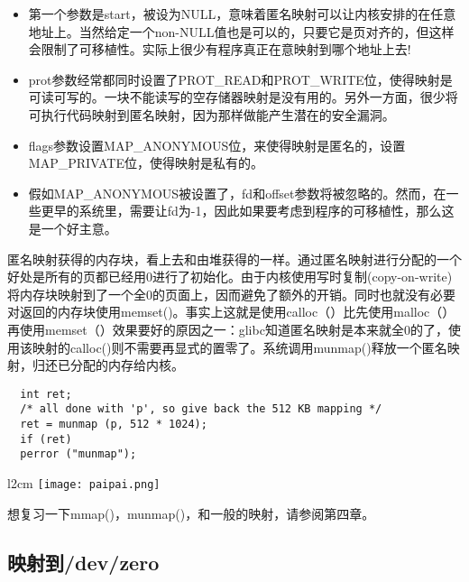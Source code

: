 \begin{itemize}
\item \begin{flushleft}第一个参数是start，被设为NULL，意味着匿名映射可以让内核安排的在任意地址上。当然给定一个non-NULL值也是可以的，只要它是页对齐的，但这样会限制了可移植性。实际上很少有程序真正在意映射到哪个地址上去!\end{flushleft}
\item \begin{flushleft}prot参数经常都同时设置了PROT\_READ和PROT\_WRITE位，使得映射是可读可写的。一块不能读写的空存储器映射是没有用的。另外一方面，很少将可执行代码映射到匿名映射，因为那样做能产生潜在的安全漏洞。 \end{flushleft}
\item \begin{flushleft}flags参数设置MAP\_ANONYMOUS位，来使得映射是匿名的，设置MAP\_PRIVATE位，使得映射是私有的。 \end{flushleft}
\item \begin{flushleft}假如MAP\_ANONYMOUS被设置了，fd和offset参数将被忽略的。然而，在一些更早的系统里，需要让fd为-1，因此如果要考虑到程序的可移植性，那么这是一个好主意。 \end{flushleft}
\end{itemize}

匿名映射获得的内存块，看上去和由堆获得的一样。通过匿名映射进行分配的一个好处是所有的页都已经用0进行了初始化。由于内核使用写时复制(copy-on-write)将内存块映射到了一个全0的页面上，因而避免了额外的开销。同时也就没有必要对返回的内存块使用memset()。事实上这就是使用calloc（）比先使用malloc（）再使用memset（）效果要好的原因之一：glibc知道匿名映射是本来就全0的了，使用该映射的calloc()则不需要再显式的置零了。系统调用munmap()释放一个匿名映射，归还已分配的内存给内核。 

\begin{lstlisting}
  int ret;
  /* all done with 'p', so give back the 512 KB mapping */
  ret = munmap (p, 512 * 1024);
  if (ret)
  perror ("munmap");
\end{lstlisting}

\begin{wrapfigure}{l}{2cm}
  \texttt{[image: paipai.png]}
\end{wrapfigure}
\mbox{}\begin{flushleft}想复习一下mmap()，munmap()，和一般的映射，请参阅第四章。\end{flushleft}


\subsection{映射到/dev/zero}


